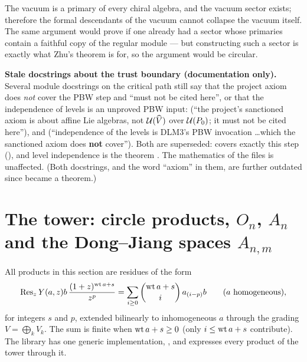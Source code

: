 \begin{physics}
The vacuum is a primary of every chiral algebra, and the vacuum sector exists; therefore the formal descendants of the vacuum
cannot collapse the vacuum itself. The same argument would prove  if one already had a sector whose primaries
contain a faithful copy of the regular module --- but constructing such a sector is exactly what Zhu's theorem is for, so
the argument would be circular.
\end{physics}

\begin{warning}
\textbf{Stale docstrings about the trust boundary (documentation only).} Several module docstrings on the critical path still say that the
project axiom does \emph{not} cover the PBW step and ``must not be cited here'', or that the independence of levels is an
unproved PBW input:  (``the project's sanctioned  axiom is about affine
Lie algebras, not $\mathcal{U}(\widehat{V})$ over $\mathcal{U}(P_0)$; it must not be cited here''), and
 (``independence of the levels is DLM3's PBW invocation \ldots which the sanctioned
 axiom does \textbf{not} cover''). Both are superseded:  covers exactly this step
(), and level independence is the theorem . The mathematics of the
files is unaffected. (Both docstrings, and the word ``axiom'' in them, are further outdated since  became a
theorem.)
\end{warning}

\section{The tower: circle products, \texorpdfstring{$O_n$}{O\_n}, \texorpdfstring{$A_n$}{A\_n} and the Dong--Jiang spaces \texorpdfstring{$A_{n,m}$}{A\_\{n,m\}}}\label{l13:sec:tower}

All products in this section are residues of the form
\begin{equation}\label{l13:eq:res}
 \operatorname{Res}_z Y(a,z)b\,\frac{(1+z)^{\operatorname{wt} a+s}}{z^{p}} = \sum_{i\ge0}\binom{\operatorname{wt} a+s}{i}\,a_{(i-p)}b\qquad(a\text{ homogeneous}),
\end{equation}
for integers $s$ and $p$, extended bilinearly to inhomogeneous $a$ through the grading $V = \bigoplus_kV_k$. The sum is finite
when $\operatorname{wt} a+s\ge0$ (only $i\le\operatorname{wt} a+s$ contribute). The library has one generic implementation, , and
expresses every product of the tower through it.

